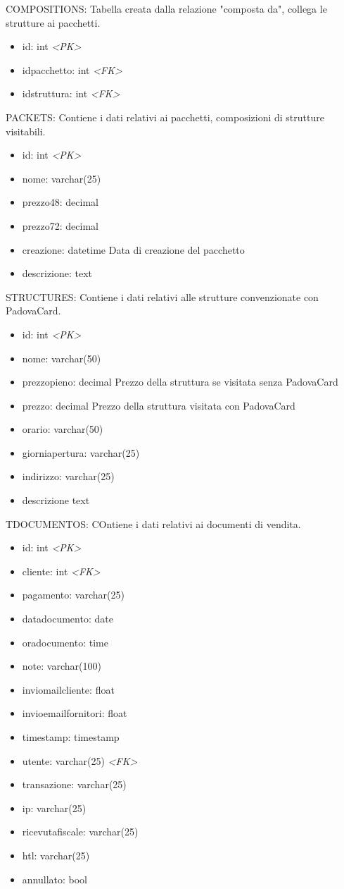 COMPOSITIONS: Tabella creata dalla relazione "composta da", collega le strutture ai pacchetti.
\begin{itemize}
\item id: int \textit{\textless PK\textgreater}
\item idpacchetto: int \textit{\textless FK\textgreater}
\item idstruttura: int \textit{\textless FK\textgreater}
\end{itemize}
PACKETS: Contiene i dati relativi ai pacchetti, composizioni di strutture visitabili.
\begin{itemize}
\item id: int \textit{\textless PK\textgreater}
\item nome: varchar(25)
\item prezzo48: decimal
\item prezzo72: decimal
\item creazione: datetime Data di creazione del pacchetto
\item descrizione: text
\end{itemize}
STRUCTURES: Contiene i dati relativi alle strutture convenzionate con PadovaCard.
\begin{itemize}
\item id: int \textit{\textless PK\textgreater}
\item nome: varchar(50)
\item prezzopieno: decimal Prezzo della struttura se visitata senza PadovaCard
\item prezzo: decimal Prezzo della struttura visitata con PadovaCard
\item orario: varchar(50)
\item giorniapertura: varchar(25)
\item indirizzo: varchar(25)
\item descrizione text
\end{itemize}
TDOCUMENTOS: COntiene i dati relativi ai documenti di vendita.
\begin{itemize}
\item id: int \textit{\textless PK\textgreater}
\item cliente: int \textit{\textless FK\textgreater}
\item pagamento: varchar(25)
\item datadocumento: date
\item oradocumento: time
\item note: varchar(100)
\item inviomailcliente: float
\item invioemailfornitori: float
\item timestamp: timestamp
\item utente: varchar(25) \textit{\textless FK\textgreater}
\item transazione: varchar(25)
\item ip: varchar(25) 
\item ricevutafiscale: varchar(25)
\item htl: varchar(25)
\item annullato: bool
\end{itemize}
